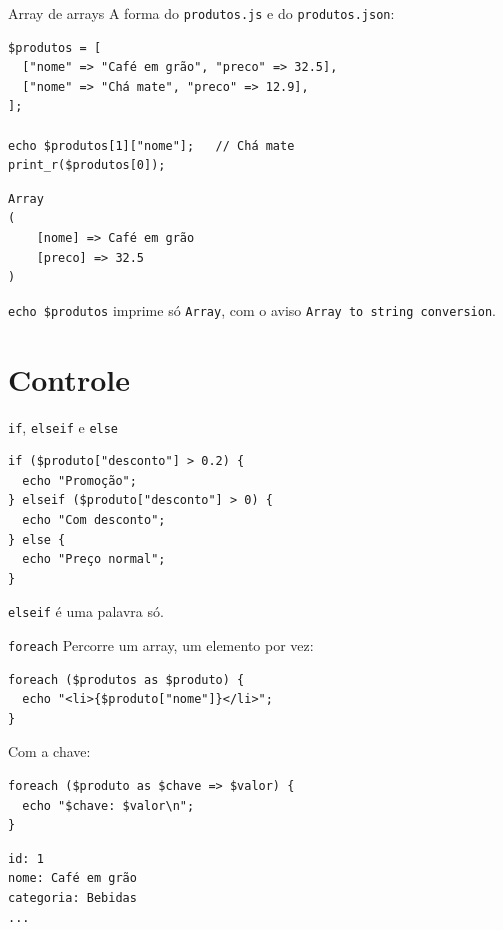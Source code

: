 \documentclass{beamer}
\begin{document}
\begin{frame}[fragile]{Array de arrays}
	A forma do \texttt{produtos.js} e do \texttt{produtos.json}:

	\begin{verbatim}
$produtos = [
  ["nome" => "Café em grão", "preco" => 32.5],
  ["nome" => "Chá mate", "preco" => 12.9],
];

echo $produtos[1]["nome"];   // Chá mate
print_r($produtos[0]);
	\end{verbatim}

	\begin{verbatim}
Array
(
    [nome] => Café em grão
    [preco] => 32.5
)
	\end{verbatim}

	\texttt{echo \$produtos} imprime só \texttt{Array}, com o aviso
	\texttt{Array to string conversion}.
\end{frame}

\section{Controle}

\begin{frame}[fragile]{\texttt{if}, \texttt{elseif} e \texttt{else}}
	\begin{verbatim}
if ($produto["desconto"] > 0.2) {
  echo "Promoção";
} elseif ($produto["desconto"] > 0) {
  echo "Com desconto";
} else {
  echo "Preço normal";
}
	\end{verbatim}

	\vspace{0.2cm}
	\texttt{elseif} é uma palavra só.
\end{frame}

\begin{frame}[fragile]{\texttt{foreach}}
	Percorre um array, um elemento por vez:

	\begin{verbatim}
foreach ($produtos as $produto) {
  echo "<li>{$produto["nome"]}</li>";
}
	\end{verbatim}

	Com a chave:

	\begin{verbatim}
foreach ($produto as $chave => $valor) {
  echo "$chave: $valor\n";
}
	\end{verbatim}

	\begin{verbatim}
id: 1
nome: Café em grão
categoria: Bebidas
...
	\end{verbatim}
\end{frame}
\end{document}
